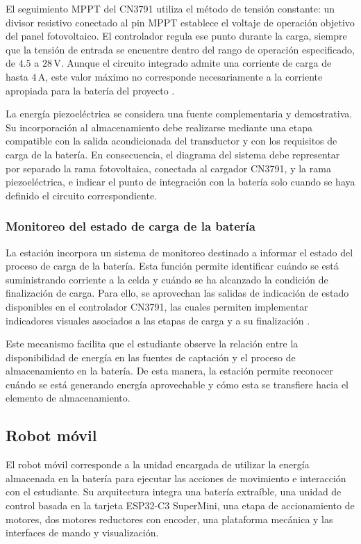 \documentclass[11pt]{article}
\begin{document}
El seguimiento MPPT del CN3791 utiliza el método de tensión constante: un
divisor resistivo conectado al pin MPPT establece el voltaje de operación
objetivo del panel fotovoltaico. El controlador regula ese punto durante la
carga, siempre que la tensión de entrada se encuentre dentro del rango de
operación especificado, de \(4.5\) a \(28\,\mathrm{V}\). Aunque el circuito
integrado admite una corriente de carga de hasta \(4\,\mathrm{A}\), este
valor máximo no corresponde necesariamente a la corriente apropiada para la
batería del proyecto \cite{consonance_cn3791_datasheet}.

La energía piezoeléctrica se considera una fuente complementaria y
demostrativa. Su incorporación al almacenamiento debe realizarse mediante
una etapa compatible con la salida acondicionada del transductor y con los
requisitos de carga de la batería. En consecuencia, el diagrama del sistema
debe representar por separado la rama fotovoltaica, conectada al cargador
CN3791, y la rama piezoeléctrica, e indicar el punto de integración con la
batería solo cuando se haya definido el circuito correspondiente.

\subsubsection{Monitoreo del estado de carga de la batería}

La estación incorpora un sistema de monitoreo destinado a informar el estado del proceso de carga de la batería. Esta función permite identificar cuándo se está suministrando corriente a la celda y cuándo se ha alcanzado la condición de finalización de carga. Para ello, se aprovechan las salidas de indicación de estado disponibles en el controlador CN3791, las cuales permiten implementar indicadores visuales asociados a las etapas de carga y a su finalización \cite{consonance_cn3791_datasheet}.

Este mecanismo facilita que el estudiante observe la relación entre la disponibilidad de energía en las fuentes de captación y el proceso de almacenamiento en la batería. De esta manera, la estación permite reconocer cuándo se está generando energía aprovechable y cómo esta se transfiere hacia el elemento de almacenamiento.

\subsection{Robot móvil}

El robot móvil corresponde a la unidad encargada de utilizar la energía almacenada en la batería para ejecutar las acciones de movimiento e interacción con el estudiante. Su arquitectura integra una batería extraíble, una unidad de control basada en la tarjeta ESP32-C3 SuperMini, una etapa de accionamiento de motores, dos motores reductores con encoder, una plataforma mecánica y las interfaces de mando y visualización.
\end{document}
